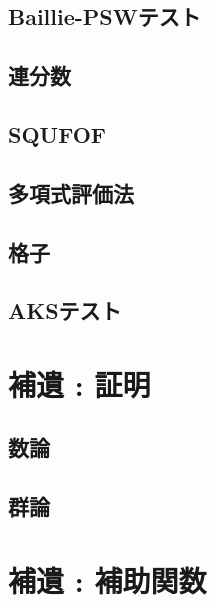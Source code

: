 \subsection{Baillie-PSWテスト}

\subsection{連分数}

\subsection{SQUFOF}

\subsection{多項式評価法}

\subsection{格子}

\subsection{AKSテスト}


\section{補遺 : 証明}
\subsection{数論}

\subsection{群論}

\section{補遺 : 補助関数}


\newpage
\printindex



